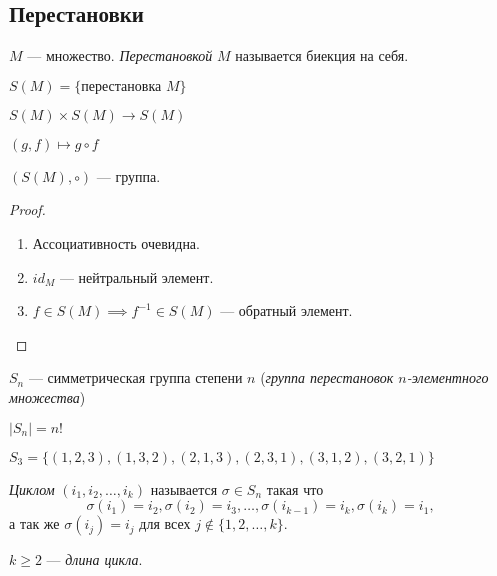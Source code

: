 \subsection{Перестановки}

\begin{defn}
    $M$ --- множество. \emph{Перестановкой} $M$ называется биекция на себя.

    $S(M) = \{ \text{перестановка } M \}$

    $S(M) \times S(M) \to S(M)$

    $(g, f) \mapsto g \circ f$
\end{defn}

\begin{theorem-non}
    $(S(M), \circ)$ --- группа.
\end{theorem-non}

\begin{proof}
    \begin{enumerate}
        \item Ассоциативность очевидна.
        
        \item $id_M$ --- нейтральный элемент.
        
        \item $f \in S(M) \implies f^{-1} \in S(M)$ --- обратный элемент.
    \end{enumerate}
\end{proof}

\begin{defn}
    $S_n$ --- симметрическая группа степени $n$ (\emph{группа перестановок $n$-элементного множества})
\end{defn}

\begin{notice}
    $|S_n| = n!$
\end{notice}

\begin{example}
    $S_3 = \{ (1, 2, 3), (1, 3, 2), (2, 1, 3), (2, 3, 1), (3, 1, 2), (3, 2, 1) \}$
\end{example}

\begin{defn}
    \emph{Циклом} $(i_1, i_2, \ldots, i_k)$ называется $\sigma \in S_n$ такая что $$\sigma(i_1) = i_2, \sigma(i_2) = i_3, \ldots, \sigma(i_{k - 1}) = i_k, \sigma(i_k) = i_1,$$ а так же $\sigma(i_j) = i_j$ для всех $j \notin \{ 1, 2, \ldots, k \}$.

    $k \geq 2$ --- \emph{длина цикла}.
\end{defn}

